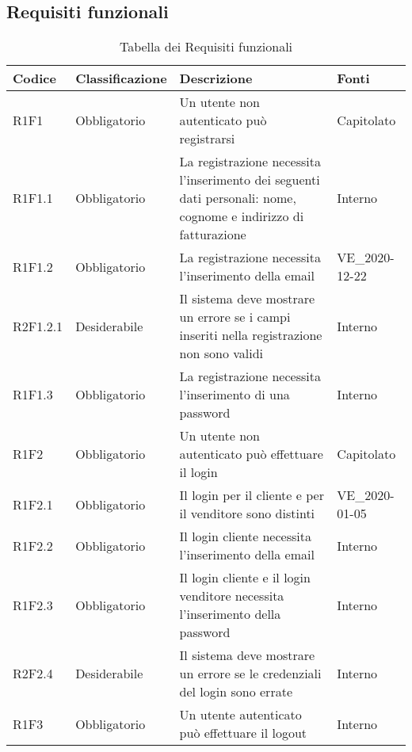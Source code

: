 \subsection{Requisiti funzionali} 


{


\centering
\renewcommand{\arraystretch}{2}
\begin{longtable}{C{2.5cm} C{2.8cm} C{6.7cm} C{2.5cm}}
\caption{Tabella dei Requisiti funzionali}\\
\textbf{Codice} &
\textbf{Classificazione}&
\textbf{Descrizione}&
\textbf{Fonti}\\
\endhead


R1F1 & Obbligatorio & Un utente non autenticato può registrarsi & Capitolato \\
R1F1.1 & Obbligatorio & La registrazione necessita l'inserimento dei seguenti dati personali: nome, cognome e indirizzo di fatturazione & Interno \\
R1F1.2 & Obbligatorio & La registrazione necessita l'inserimento della email & VE\_2020-12-22 \\
R2F1.2.1 & Desiderabile & Il sistema deve mostrare un errore se i campi inseriti nella registrazione non sono validi & Interno \\
R1F1.3 & Obbligatorio & La registrazione necessita l'inserimento di una password & Interno \\


R1F2 & Obbligatorio & Un utente non autenticato può effettuare il login & Capitolato \\
R1F2.1 & Obbligatorio & Il login per il cliente e per il venditore sono distinti & VE\_2020-01-05 \\
R1F2.2 & Obbligatorio & Il login cliente necessita l'inserimento della email & Interno \\
R1F2.3 & Obbligatorio & Il login cliente e il login venditore necessita l'inserimento della password & Interno \\
R2F2.4 & Desiderabile & Il sistema deve mostrare un errore se le credenziali del login sono errate & Interno \\


R1F3 & Obbligatorio & Un utente autenticato può effettuare il logout & Interno \\


\end{longtable}}
